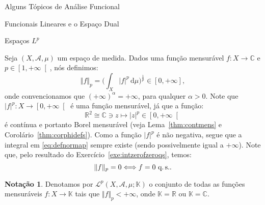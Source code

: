 \documentclass[oneside,final,11pt]{amsbook}
\newcommand{\R}{\mathds R}
\newcommand{\C}{\mathds C}
\newcommand{\K}{\mathds K}
\newcommand{\dd}{\mathrm d}
\newcommand{\qs}{\hbox{q.$\,$s.}}
\theoremstyle{remark}\newtheorem{exercise}{Exercício}[chapter]
\theoremstyle{remark}\newtheorem{*exercise}[exercise]{\hbox to 0pt{\hskip 0pt minus 1fil*}Exercício}
\theoremstyle{definition}\newtheorem{exdefin}{Definição}[chapter]
\theoremstyle{plain}\newtheorem{teo}{Teorema}[section]
\theoremstyle{plain}\newtheorem{lem}[teo]{Lema}
\theoremstyle{plain}\newtheorem{prop}[teo]{Proposição}
\theoremstyle{plain}\newtheorem{cor}[teo]{Corolário}
\theoremstyle{definition}\newtheorem{defin}[teo]{Definição}
\theoremstyle{remark}\newtheorem{rem}[teo]{Observação}
\theoremstyle{definition}\newtheorem{notation}[teo]{Notação}
\theoremstyle{definition}\newtheorem{convention}[teo]{Convenção}
\theoremstyle{definition}\newtheorem{example}[teo]{Exemplo}
\numberwithin{section}{chapter}
\numberwithin{equation}{section}
\begin{document}
\begin{chapter}{Alguns Tópicos de Análise Funcional}
\begin{section}{Funcionais Lineares e o Espaço Dual}
\end{section}

\begin{section}[Espaços $L^p$]{Espaços ${L^p}$}
\label{sec:espacosLp}

Seja $(X,\mathcal A,\mu)$ um espaço de medida. Dados uma função mensurável $f:X\to\C$ e $p\in\left[1,+\infty\right[$,
nós definimos:
\begin{equation}\label{eq:defnormap}
\Vert f\Vert_p=\Big(\int_X\vert f\vert^p\,\dd\mu\Big)^{\frac1p}\in[0,+\infty],
\end{equation}
onde convencionamos que $(+\infty)^\alpha=+\infty$, para qualquer $\alpha>0$.
Note que $\vert f\vert^p:X\to\left[0,+\infty\right[$ é uma função mensurável, já que a função:
\[\R^2\cong\C\ni z\longmapsto\vert z\vert^p\in\left[0,+\infty\right[\]
é contínua e portanto Borel mensurável (veja Lema~\ref{thm:contmens} e Corolário~\ref{thm:corphidefs}).
Como a função $\vert f\vert^p$ é não negativa,
segue que a integral em \eqref{eq:defnormap} sempre existe (sendo possivelmente igual a $+\infty$).
Note que, pelo resultado do Exercício~\ref{exe:intzerofzeroqs}, temos:
\begin{equation}\label{eq:normapzero}
\Vert f\Vert_p=0\Longleftrightarrow f=0\ \qs.
\end{equation}

\begin{notation}
Denotamos por $\mathcal L^p(X,\mathcal A,\mu;\K)$\index[simbolos]{$\mathcal L^p(X,\mathcal A,\mu;\K)$} o
conjunto de todas as funções mensuráveis
$f:X\to\K$ tais que $\Vert f\Vert_p<+\infty$, onde $\K=\R$ ou $\K=\C$.
\end{notation}


\end{section}
\end{chapter}
\end{document}
